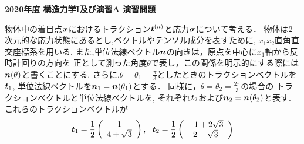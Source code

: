 \documentclass[10pt,a4j]{jarticle}
\newlength{\minitwocolumn}
\begin{document}
\newcommand{\fat}[1]{\mbox{\boldmath $#1$}}
\newcommand{\D}{\partial}
\newcommand{\w}{\omega}
\newcommand{\ga}{\alpha}
\newcommand{\gb}{\beta}
\newcommand{\gx}{\xi}
\newcommand{\gz}{\zeta}
\newcommand{\vhat}[1]{\hat{\fat{#1}}}
\newcommand{\spc}{\vspace{0.7\baselineskip}}
\newcommand{\halfspc}{\vspace{0.3\baselineskip}}

\pagestyle{empty}
\newcommand{\twofig}[2]
 {
   \begin{figure}[h]
     \begin{minipage}[t]{\minitwocolumn}
         \begin{center}   #1
         \end{center}
     \end{minipage}
         \hspace{\columnsep}
     \begin{minipage}[t]{\minitwocolumn}
         \begin{center} #2
         \end{center}
     \end{minipage}
   \end{figure}
 }
\begin{center}
	{\Large \bf 2020年度 構造力学I及び演習A 演習問題}
\end{center}
\vspace{5mm}
物体中の着目点$\fat{x}$におけるトラクション$\fat{t}^{(n)}$と応力$\fat{\sigma}$について考える．
物体は2次元的な応力状態にあるとし,ベクトルやテンソル成分を表すために, $x_1x_2$直角直交座標系を用いる.
また,単位法線ベクトル$\fat{n}$の向きは，原点を中心に$x_1$軸から反時計回りの方向を
正として測った角度$\theta$で表し，この関係を明示的にする際には$\fat{n}(\theta)$と書くことにする.
さらに,$\theta=\theta_1=\frac{\pi}{3}$としたときのトラクションベクトルを$\fat{t}_1$, 
単位法線ベクトルを$\fat{n}_1=\fat{n}(\theta_1)$とする．
同様に，$\theta=\theta_2=\frac{2\pi}{3}$の場合の
トラクションベクトルと単位法線ベクトルを, それぞれ$\fat{t}_2$および$\fat{n}_2=\fat{n}(\theta_2)$と表す. 
これらのトラクションベクトルが
\[
	\fat{t}_1=
	\frac{1}{2}
	\left(
		\begin{array}{c}
			1 \\
			4+\sqrt{3} 
		\end{array}
	\right), \ \ 
	\fat{t}_2=
	\frac{1}{2}
	\left(
		\begin{array}{c}
			-1+2\sqrt{3} \\
			2+\sqrt{3}
		\end{array}
	\right)
\]
\end{document}
